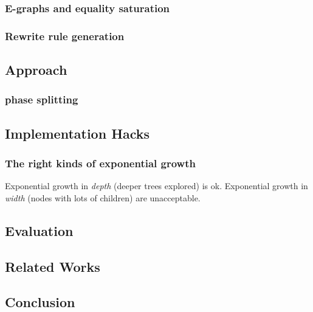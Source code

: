\documentclass[11pt]{article}
\begin{document}
\subsubsection{E-graphs and equality saturation}
\label{sec:org01b7167}

\subsubsection{Rewrite rule generation}
\label{sec:org35070c9}

\subsection{Approach}
\label{sec:org03ba293}

\subsubsection{phase splitting}
\label{sec:orgc926359}

\subsection{Implementation Hacks}
\label{sec:orga50831b}

\subsubsection{The right kinds of exponential growth}
\label{sec:orgb8ac2cd}

Exponential growth in \emph{depth} (deeper trees explored) is ok. Exponential growth in \emph{width} (nodes with lots of children) are unacceptable.

\subsection{Evaluation}
\label{sec:org2890bb5}

\subsection{Related Works}
\label{sec:orgbc382d7}

\subsection{Conclusion}
\label{sec:orgd22acaa}
\end{document}
